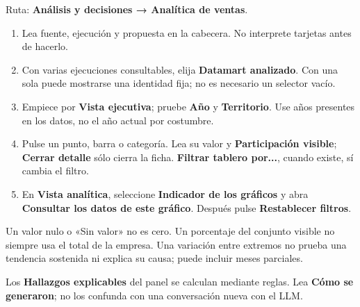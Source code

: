 Ruta: \textbf{Análisis y decisiones → Analítica de ventas}.
\begin{enumerate}
\item Lea fuente, ejecución y propuesta en la cabecera. No interprete tarjetas antes de hacerlo.
\item Con varias ejecuciones consultables, elija \textbf{Datamart analizado}. Con una sola puede mostrarse una identidad fija; no es necesario un selector vacío.
\item Empiece por \textbf{Vista ejecutiva}; pruebe \textbf{Año} y \textbf{Territorio}. Use años presentes en los datos, no el año actual por costumbre.
\item Pulse un punto, barra o categoría. Lea su valor y \textbf{Participación visible}; \textbf{Cerrar detalle} sólo cierra la ficha. \textbf{Filtrar tablero por...}, cuando existe, sí cambia el filtro.
\item En \textbf{Vista analítica}, seleccione \textbf{Indicador de los gráficos} y abra \textbf{Consultar los datos de este gráfico}. Después pulse \textbf{Restablecer filtros}.
\end{enumerate}
\begin{note}
Un valor nulo o «Sin valor» no es cero. Un porcentaje del conjunto visible no siempre usa el total de la empresa. Una variación entre extremos no prueba una tendencia sostenida ni explica su causa; puede incluir meses parciales.
\end{note}
Los \textbf{Hallazgos explicables} del panel se calculan mediante reglas. Lea \textbf{Cómo se generaron}; no los confunda con una conversación nueva con el LLM.

